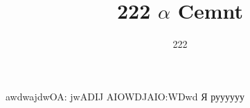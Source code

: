 \documentclass{mipt-thesis-bs}
\title{222 $\alpha$ Cemnt}
\author{222}
\begin{document}
awdwajdwOA: jwADIJ AIOWDJAIO:WDwd 
Я руууууу
\end{document}
